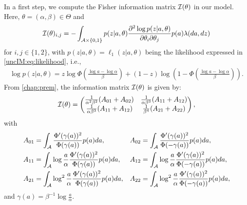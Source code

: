          In a first step, we compute the Fisher information matrix $\mathcal{I}(\theta)$ in our model. 
        Here, $\theta=(\alpha,\beta)\in \Theta$ and 
            \begin{equation}
                \mathcal{I}(\theta)_{i,j}= -\int_{\mathcal{A} \times \{0,1\}} p(z|a,\theta)\frac{\partial^2 \log p(z|a,\theta)}{\partial\theta_i \partial\theta_j} p(a)\lambda(da,dz)
            \end{equation}
        for $i,j\in\{1,2\}$, with $p(z|a,\theta)=\ell_1(z|a,\theta)$ being the likelihood expressed in \cref{uncIM:eq:likelihood}, i.e.,
            \begin{align}
                \log p(z|a,\theta) %
                = z\log\Phi\left(\frac{\log a-\log\alpha}{\beta}\right) + (1-z)\log\left(1-\Phi\left(\frac{\log a-\log\alpha}{\beta}\right)\right).
            \end{align}
	From \cref{chap:prem}, the information matrix $\mathcal{I}(\theta)$ is given by:
        \begin{equation}
            \mathcal{I}(\theta)=\begin{pmatrix}
            \frac{1}{\alpha^2\beta^2}(A_{01} + A_{02}) & \frac{1}{\alpha\beta^3}(A_{11}+A_{12}) \\
            \frac{1}{\alpha\beta^3}(A_{11}+A_{12}) & \frac{1}{\beta^4}(A_{21}+A_{22})
        \end{pmatrix}  ,
        \end{equation}
with
           \begin{equation} \label{uncIM:eq:Aij}
        \begin{aligned}
            A_{01} &= \int_{\mathcal{A}}\frac{\Phi'(\gamma(a))^2}{\Phi(\gamma(a))}p(a)da,
            & A_{02} &= \int_{\mathcal{A}}\frac{\Phi'(\gamma(a))^2}{\Phi(-\gamma(a))}p(a)da,\\
            A_{11} &= \int_{\mathcal{A}}\log\frac{a}{\alpha}\frac{\Phi'(\gamma(a))^2}{\Phi(\gamma(a))}p(a)da,
            & A_{12} &= \int_{\mathcal{A}}\log\frac{a}{\alpha}\frac{\Phi'(\gamma(a))^2}{\Phi(-\gamma(a))}p(a)da,\\
            A_{21} &= \int_{\mathcal{A}}\log^2\frac{a}{\alpha}\frac{\Phi'(\gamma(a))^2}{\Phi(\gamma(a))}p(a)da,
            & A_{22} &= \int_{\mathcal{A}}\log^2\frac{a}{\alpha}\frac{\Phi'(\gamma(a))^2}{\Phi(-\gamma(a))}p(a)da,\\
        \end{aligned}
        \end{equation}
and $\gamma(a)=\beta^{-1}\log\frac{a}{\alpha}$.
        
